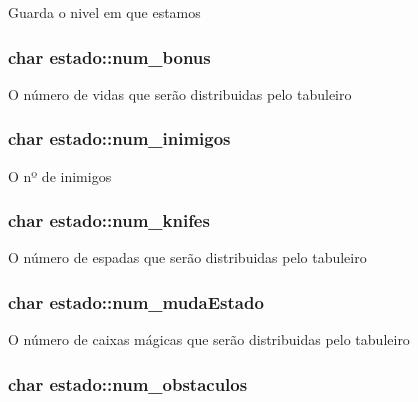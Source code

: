 Guarda o nivel em que estamos \hypertarget{structestado_a049c518bf8234b3477b9b34ec46cdf06}{
\subsubsection[{num\+\_\+bonus}]{\setlength{\rightskip}{0pt plus 5cm}char estado\+::num\+\_\+bonus}}\label{structestado_a049c518bf8234b3477b9b34ec46cdf06}
O número de vidas que serão distribuidas pelo tabuleiro \hypertarget{structestado_a6fbc4a80c4f371036f264ecfe27e5f9e}{
\subsubsection[{num\+\_\+inimigos}]{\setlength{\rightskip}{0pt plus 5cm}char estado\+::num\+\_\+inimigos}}\label{structestado_a6fbc4a80c4f371036f264ecfe27e5f9e}
O nº de inimigos \hypertarget{structestado_ad3c2d30fa4a26a98157482b44dc9c02a}{
\subsubsection[{num\+\_\+knifes}]{\setlength{\rightskip}{0pt plus 5cm}char estado\+::num\+\_\+knifes}}\label{structestado_ad3c2d30fa4a26a98157482b44dc9c02a}
O número de espadas que serão distribuidas pelo tabuleiro \hypertarget{structestado_a036e8e4f35600bb8f0035dc4dd1424fb}{
\subsubsection[{num\+\_\+muda\+Estado}]{\setlength{\rightskip}{0pt plus 5cm}char estado\+::num\+\_\+muda\+Estado}}\label{structestado_a036e8e4f35600bb8f0035dc4dd1424fb}
O número de caixas mágicas que serão distribuidas pelo tabuleiro \hypertarget{structestado_ac1a8a541e2301189833c6f713c416063}{
\subsubsection[{num\+\_\+obstaculos}]{\setlength{\rightskip}{0pt plus 5cm}char estado\+::num\+\_\+obstaculos}}\label{structestado_ac1a8a541e2301189833c6f713c416063}
